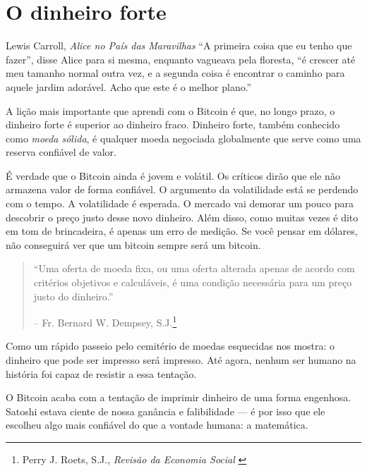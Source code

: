 \chapter{O dinheiro forte}
\label{les:14}

\begin{chapquote}{Lewis Carroll, \textit{Alice no País das Maravilhas}}
\enquote{A primeira coisa que eu tenho que fazer}, disse Alice para si mesma, enquanto vagueava pela floresta, \enquote{é crescer até meu tamanho normal outra vez, e a segunda coisa é encontrar o caminho para aquele jardim adorável. Acho que este é o melhor plano.}
\end{chapquote}

A lição mais importante que aprendi com o Bitcoin é que, no longo prazo, o dinheiro forte é superior ao dinheiro fraco. Dinheiro forte, também conhecido como \textit{moeda sólida}, é qualquer moeda negociada globalmente que serve como uma reserva confiável de valor.

É verdade que o Bitcoin ainda é jovem e volátil. Os críticos dirão que ele não armazena valor de forma confiável. O argumento da volatilidade está se perdendo com o tempo. A volatilidade é esperada. O mercado vai demorar um pouco para descobrir o preço justo desse novo dinheiro. Além disso, como muitas vezes é dito em tom de brincadeira, é apenas um erro de medição. Se você pensar em dólares, não conseguirá ver que um bitcoin sempre será um bitcoin.

\begin{quotation}\begin{samepage}
\enquote{Uma oferta de moeda fixa, ou uma oferta alterada apenas de acordo com
critérios objetivos e calculáveis, é uma condição necessária para um preço justo do dinheiro.}
\begin{flushright} -- Fr. Bernard W. Dempsey, S.J.\footnote{Perry J. Roets, S.J., \textit{Revisão da Economia Social} \cite{review-social-economy}}
\end{flushright}\end{samepage}\end{quotation}

\newpage

Como um rápido passeio pelo cemitério de moedas esquecidas nos mostra: o dinheiro que pode ser impresso será impresso. Até agora, nenhum ser humano na história foi capaz de resistir a essa tentação.

O Bitcoin acaba com a tentação de imprimir dinheiro de uma forma engenhosa. Satoshi estava ciente de nossa ganância e falibilidade --- é por isso que ele escolheu algo mais confiável do que a vontade humana: a matemática.

